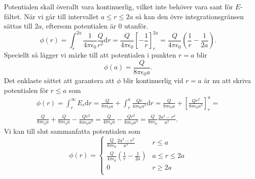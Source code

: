 \documentclass[%
oneside,                 %
final,                   %
10pt]{article}
\newenvironment{notice_mdfboxadmon}[1][]{
\begin{notice_mdfboxmdframed}[frametitle=#1]
}
{
\end{notice_mdfboxmdframed}
}
\begin{document}
\begin{notice_mdfboxadmon}
Potentialen skall överallt vara kontinuerlig, vilket inte behöver vara
sant för $E$-fältet. När vi går till
intervallet $a \le r \le 2a$ så kan den övre integrationsgränsen
sättas till $2a$, eftersom potentialen är 0 utanför.
\begin{equation}
  \phi\left(r\right) = \int_r^{2a} \frac{1}{4\pi \epsilon_0} \frac{Q}{r^2}
\mbox{d}r = \frac{Q}{4\pi\epsilon_0}\left[- \frac{1}{r}\right]_r^{2a} =
\frac{Q}{4\pi\epsilon_0} \left(\frac{1}{r}-\frac{1}{2a}\right).
\end{equation}
Speciellt så lägger vi märke till att potentialen i punkten $r = a$
blir
\begin{equation}
  \phi \left(a\right) = \frac{Q}{8\pi \epsilon_0 a}.
\end{equation}
Det enklaste sättet att garantera att $\phi$ blir kontinuerlig vid $r = a$
är nu att skriva potentialen för $r\le a$ som
\begin{align}
  \phi \left(r\right) = \int_r^\infty E_r \mbox{d}r = 
\frac{Q}{8\pi \epsilon_0 a} + \int_r^a \frac{Qr}{4\pi \epsilon_0 a^3} 
\mbox{d}r = \frac{Q}{8\pi \epsilon_0 a} + 
\left[\frac{Qr^2}{8\pi \epsilon_0 a^3}\right]_r^a = \nonumber \\
\frac{Q}{8\pi \epsilon_0 a} 
+  \frac{Q}{8\pi \epsilon_0 a} - \frac{Qr^2}{8\pi \epsilon_0 a^3} = 
\frac{Q}{4\pi \epsilon_0 a} - \frac{Qr^2}{8\pi \epsilon_0 a^3} =
\frac{Q}{8\pi \epsilon_0} \frac{2a^2 -r^2}{a^3}.
\end{align}
Vi kan till slut sammanfatta potentialen som
\begin{equation}
  \phi\left(r\right) = \left\{\begin{array}{lr}
\frac{Q}{8\pi \epsilon_0} \frac{2a^2 -r^2}{a^3} & r\le a\\
\frac{Q}{4\pi \epsilon_0} \left(\frac{1}{r} - \frac{1}{2a}\right) & a\le r \le 
2a\\
0 & r \ge 2a\\
\end{array}
\right.
\end{equation}
\end{notice_mdfboxadmon} %
\end{document}
